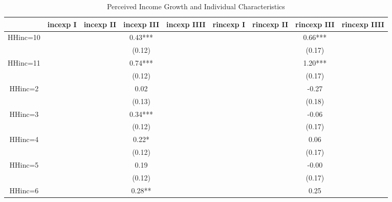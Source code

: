 \documentclass[12pt,notitlepage,onecolumn,aps,pra]{article}
\begin{document}
       
\begin{table}[ht]
\centering
\begin{adjustbox}{width={0.9\textwidth},totalheight={\textheight}}
\begin{threeparttable}
\caption{Perceived Income Growth and Individual Characteristics}
\label{micro_reg_exp}\begin{tabular}{ccccccccc}
\toprule
{} &  incexp I & incexp II & incexp III & incexp IIII & rincexp I & rincexp II & rincexp III & rincexp IIII \\
\midrule
HHinc=10     &           &           &    0.43*** &             &           &            &     0.66*** &              \\
             &           &           &     (0.12) &             &           &            &      (0.17) &              \\
HHinc=11     &           &           &    0.74*** &             &           &            &     1.20*** &              \\
             &           &           &     (0.12) &             &           &            &      (0.17) &              \\
HHinc=2      &           &           &       0.02 &             &           &            &       -0.27 &              \\
             &           &           &     (0.13) &             &           &            &      (0.18) &              \\
HHinc=3      &           &           &    0.34*** &             &           &            &       -0.06 &              \\
             &           &           &     (0.12) &             &           &            &      (0.17) &              \\
HHinc=4      &           &           &      0.22* &             &           &            &        0.06 &              \\
             &           &           &     (0.12) &             &           &            &      (0.17) &              \\
HHinc=5      &           &           &       0.19 &             &           &            &       -0.00 &              \\
             &           &           &     (0.12) &             &           &            &      (0.17) &              \\
HHinc=6      &           &           &     0.28** &             &           &            &        0.25 &              \\

\end{tabular}
\end{threeparttable}
\end{adjustbox}
\end{table}
\end{document}
